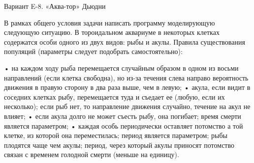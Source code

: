 
Вариант E-8. «Аква-тор» Дьюдни

В рамках общего условия задачи написать программу моделирующую следующую
ситуацию. В тороидальном аквариуме в некоторых клетках содержатся особи одного
из двух видов: рыбы и акулы. Правила существования популяций (параметры
следует подобрать самостоятельно):

• на каждом ходу рыба перемещается случайным образом в одном из восьми
  направлений (если клетка свободна), но из-за течения слева направо
  вероятность движения в правую сторону в два раза выше, чем в левую;
• акула, если видит в соседних клетках рыбу, перемещается туда и съедает ее
  (любую, если их несколько); если рыб нет, то направление движения случайно,
  течение на акул не влияет;
• если акула долго не может съесть рыбу, она погибает; время смерти является
  параметром;
• каждая особь периодически оставляет потомство а той клетке, из которой она
  переместилась; период является параметром; рыбы плодятся чаще чем акулы;
  период, через который акулы приносят потомство связан с временем голодной
  смерти (меньше на единицу).

